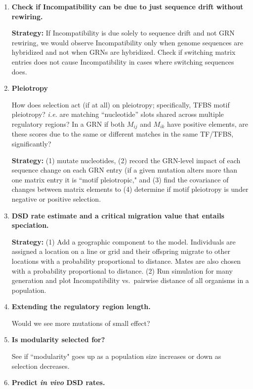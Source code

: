 \documentclass[a4paper, 11 pt]{article}
\begin{document}
\begin{enumerate}
    (1) nucleotide: the number of substitutions vs.\ the mutation rate (\emph{i.e.} expected without selection). (2) network(G): Euclidean distance vs.\ expected under just mutation. 

  \item \textbf{Check if Incompatibility can be due to just sequence drift without rewiring.}

    \textbf{Strategy:} If Incompatibility is due solely to sequence drift and not GRN rewiring, we would observe Incompatibility only when genome sequences are hybridized and not when GRNs are hybridized. Check if switching matrix entries does not cause Incompatibility in cases where switching sequences does.

  \item \textbf{Pleiotropy}

    How does selection act (if at all) on pleiotropy; specifically, TFBS motif pleiotropy? \emph{i.e.} are matching ``nucleotide'' slots shared across multiple regulatory regions? In a GRN if both $M_{ij}$ and $M_{ik}$ have positive elements, are these scores due to the same or different matches in the same TF/TFBS, significantly?  

    \textbf{Strategy:} (1) mutate nucleotides, (2) record the GRN-level impact of each sequence change on each GRN entry (if a given mutation alters more than one matrix entry it is ``motif pleiotropic," and (3) find the covariance of changes between matrix elements to (4) determine if motif pleiotropy is under negative or positive selection.

  \item \textbf{DSD rate estimate and a critical migration value that entails speciation.}

    \textbf{Strategy:} (1) Add a geographic component to the model. Individuals are assigned a location on a line or grid and their offspring migrate to other locations with a probability proportional to distance. Mates are also chosen with a probability proportional to distance. (2) Run simulation for many generation and plot Incompatibility vs.\ pairwise distance of all organisms in a population.

  \item \textbf{Extending the regulatory region length.}
    
    Would we see more mutations of small effect?

  \item \textbf{Is modularity selected for?} 

    See if ``modularity" goes up as a population size increases or down as selection decreases. 

  \item \textbf{Predict \emph{in vivo} DSD rates.}
\end{enumerate}
\end{document}
